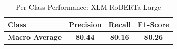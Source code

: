 \begin{table}[h]
\centering
\caption{Per-Class Performance: XLM-RoBERTa Large}
\label{tab:per_class}
\begin{tabular}{lccc}
\hline
\textbf{Class} & \textbf{Precision} & \textbf{Recall} & \textbf{F1-Score} \\
\hline
\hline
\textbf{Macro Average} & \textbf{80.44} & \textbf{80.16} & \textbf{80.26} \\
\hline
\end{tabular}
\end{table}
